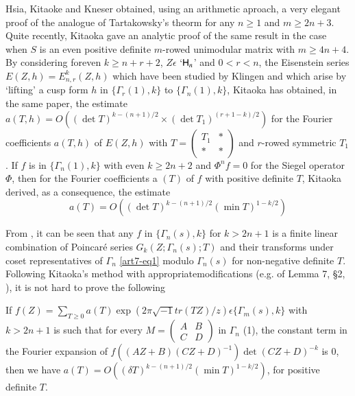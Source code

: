 \smallskip

Hsia, Kitaoke and Kneser \cite{art7-H-K-K} obtained, using an arithmetic aproach, a very elegant proof of the analogue of Tartakowsky's theorm for any $n \geqslant 1$ and $m \geqslant 2 n +3$. Quite recently, Kitaoka \cite{art7-KI} gave an analytic proof of the same result in the case when $S$ is an even positive definite $m$-rowed unimodular matrix with $m \geqslant 4n + 4$. By considering for\pageoriginale even $k \geqslant n + r + 2$, $Z \epsilon$ `$\mathsf{H}_n$' and $0< r < n$, the Eisenstein series $E(Z,h) = E^k_{n,r} (Z,h)$ which have been studied by Klingen \cite{art7-KL} and which arise by `lifting' a cusp form $h$ in $\{\Gamma_r (1), k\}$ to $\{\Gamma_n (1), k\}$, Kitaoka has obtained, in the same paper, the estimate $a(T, h) = O((\det T)^{k-(n+1)/2} \times (\det T_1)^{(r+1-k)/2})$ for the Fourier coefficients $a(T,h)$ of $E(Z,h)$ with $T = \begin{pmatrix} T_1 & \ast\\ \ast & \ast \end{pmatrix}$ and $r$-rowed symmetric $T_1$. If $f$ is in $\{\Gamma_n(1),k\}$ with even $k \geqslant 2n +2$ and $\Phi^n f = 0$ for the Siegel operator $\Phi$, then for the Fourier coefficients a $(T)$ of $f$ with positive definite $T$, Kitaoka derived, as a consequence, the estimate
\begin{equation*}
a(T) = O((\det T)^{k - (n+1)/2} (\min T)^{1-k/2} )\tag{4} \label{art7-eq4}
\end{equation*}

\smallskip

From \cite{art7-C}, it can be seen that any $f$ in $\{\Gamma_n (s), k\}$ for $k > 2 n +1$ is a finite linear combination of Poincar\'e series $G_k (Z; \Gamma_n(s); T)$ and their transforms under coset representatives of $\Gamma_n$ \eqref{art7-eq1}  modulo $\Gamma_n(s)$ for non-negative definite $T$. Following Kitaoka's method with appropriate\break modifications (e.g. of Lemma 7, \S 2, \cite{art7-KI}), it is not hard to prove the following 

\begin{theorem*}
If $f(Z) = \sum\limits_{T \geqslant 0} a (T) \exp (2 \pi \sqrt{-1} tr (TZ)/ z) \epsilon \{\Gamma_m (s), k\}$ with $k > 2 n +1$ is such that for every $M = \begin{pmatrix}A & B \\ C & D \end{pmatrix}$ in $\Gamma_n$ (1), the constant term in the Fourier expansion of $f((AZ+B)(CZ+D)^{-1}) \det (CZ+ D)^{-k}$ is $0$, then we have $a(T) = O((\delta T)^{k-(n+1)/2} (\min T)^{1-k/2})$, for positive definite $T$.
\end{theorem*}

